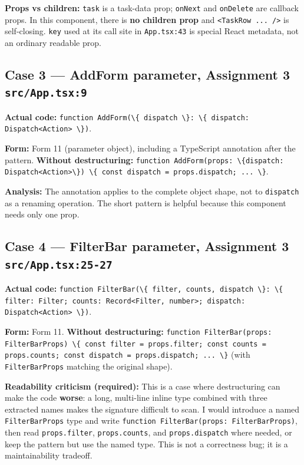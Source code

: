 \documentclass[
  9pt,
]{article}
\newcommand{\passthrough}[1]{#1}
\begin{document}
\textbf{Props vs children:} \passthrough{\lstinline!task!} is a
task-data prop; \passthrough{\lstinline!onNext!} and
\passthrough{\lstinline!onDelete!} are callback props. In this
component, there is \textbf{no children prop} and
\passthrough{\lstinline!<TaskRow ... />!} is self-closing.
\passthrough{\lstinline!key!} used at its call site in
\passthrough{\lstinline!App.tsx:43!} is special React metadata, not an
ordinary readable prop.

\subsection{\texorpdfstring{Case 3 --- AddForm parameter, Assignment 3
\texttt{src/App.tsx:9}}{Case 3 --- AddForm parameter, Assignment 3 src/App.tsx:9}}\label{case-3-addform-parameter-assignment-3-srcapp.tsx9}

\textbf{Actual code:}
\passthrough{\lstinline!function AddForm(\{ dispatch \}: \{ dispatch: Dispatch<Action> \})!}.

\textbf{Form:} Form 11 (parameter object), including a TypeScript
annotation after the pattern. \textbf{Without destructuring:}
\passthrough{\lstinline!function AddForm(props: \{dispatch: Dispatch<Action>\}) \{ const dispatch = props.dispatch; ... \}!}.

\textbf{Analysis:} The annotation applies to the complete object shape,
not to \passthrough{\lstinline!dispatch!} as a renaming operation. The
short pattern is helpful because this component needs only one prop.

\subsection{\texorpdfstring{Case 4 --- FilterBar parameter, Assignment 3
\texttt{src/App.tsx:25-27}}{Case 4 --- FilterBar parameter, Assignment 3 src/App.tsx:25-27}}\label{case-4-filterbar-parameter-assignment-3-srcapp.tsx25-27}

\textbf{Actual code:}
\passthrough{\lstinline!function FilterBar(\{ filter, counts, dispatch \}: \{ filter: Filter; counts: Record<Filter, number>; dispatch: Dispatch<Action> \})!}.

\textbf{Form:} Form 11. \textbf{Without destructuring:}
\passthrough{\lstinline!function FilterBar(props: FilterBarProps) \{ const filter = props.filter; const counts = props.counts; const dispatch = props.dispatch; ... \}!}
(with \passthrough{\lstinline!FilterBarProps!} matching the original
shape).

\textbf{Readability criticism (required):} This is a case where
destructuring can make the code \textbf{worse}: a long, multi-line
inline type combined with three extracted names makes the signature
difficult to scan. I would introduce a named
\passthrough{\lstinline!FilterBarProps!} type and write
\passthrough{\lstinline!function FilterBar(props: FilterBarProps)!},
then read \passthrough{\lstinline!props.filter!},
\passthrough{\lstinline!props.counts!}, and
\passthrough{\lstinline!props.dispatch!} where needed, or keep the
pattern but use the named type. This is not a correctness bug; it is a
maintainability tradeoff.
\end{document}
